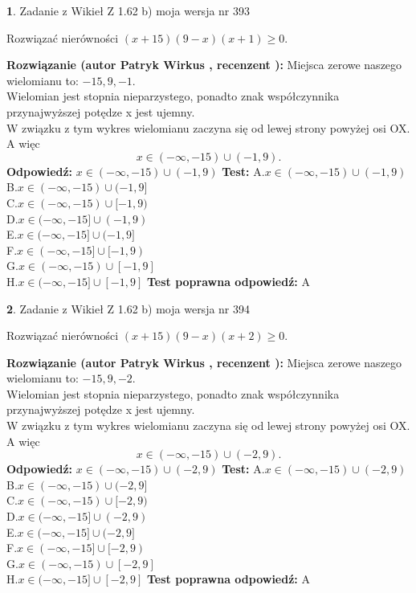 \documentclass[12pt, a4paper]{article}
\theoremstyle{definition} %
\newtheorem{zad}{}
\newcommand{\zadStart}[1]{\begin{zad}#1\newline}
\newcommand{\zadStop}{\end{zad}}
\newcommand{\rozwStart}[2]{\noindent \textbf{Rozwiązanie (autor #1 , recenzent #2): }\newline}
\newcommand{\rozwStop}{\newline}
\newcommand{\odpStart}{\noindent \textbf{Odpowiedź:}\newline}
\newcommand{\odpStop}{\newline}
\newcommand{\testStart}{\noindent \textbf{Test:}\newline}
\newcommand{\testStop}{\newline}
\newcommand{\kluczStart}{\noindent \textbf{Test poprawna odpowiedź:}\newline}
\newcommand{\kluczStop}{\newline}
\begin{document}
\zadStart{Zadanie z Wikieł Z 1.62 b) moja wersja nr 393}

Rozwiązać nierówności $(x+15)(9-x)(x+1)\ge0$.
\zadStop
\rozwStart{Patryk Wirkus}{}
Miejsca zerowe naszego wielomianu to: $-15, 9, -1$.\\
Wielomian jest stopnia nieparzystego, ponadto znak współczynnika przy\linebreak najwyższej potędze x jest ujemny.\\ W związku z tym wykres wielomianu zaczyna się od lewej strony powyżej osi OX. A więc $$x \in (-\infty,-15) \cup (-1,9).$$
\rozwStop
\odpStart
$x \in (-\infty,-15) \cup (-1,9)$
\odpStop
\testStart
A.$x \in (-\infty,-15) \cup (-1,9)$\\
B.$x \in (-\infty,-15) \cup (-1,9]$\\
C.$x \in (-\infty,-15) \cup [-1,9)$\\
D.$x \in (-\infty,-15] \cup (-1,9)$\\
E.$x \in (-\infty,-15] \cup (-1,9]$\\
F.$x \in (-\infty,-15] \cup [-1,9)$\\
G.$x \in (-\infty,-15) \cup [-1,9]$\\
H.$x \in (-\infty,-15] \cup [-1,9]$
\testStop
\kluczStart
A
\kluczStop



\zadStart{Zadanie z Wikieł Z 1.62 b) moja wersja nr 394}

Rozwiązać nierówności $(x+15)(9-x)(x+2)\ge0$.
\zadStop
\rozwStart{Patryk Wirkus}{}
Miejsca zerowe naszego wielomianu to: $-15, 9, -2$.\\
Wielomian jest stopnia nieparzystego, ponadto znak współczynnika przy\linebreak najwyższej potędze x jest ujemny.\\ W związku z tym wykres wielomianu zaczyna się od lewej strony powyżej osi OX. A więc $$x \in (-\infty,-15) \cup (-2,9).$$
\rozwStop
\odpStart
$x \in (-\infty,-15) \cup (-2,9)$
\odpStop
\testStart
A.$x \in (-\infty,-15) \cup (-2,9)$\\
B.$x \in (-\infty,-15) \cup (-2,9]$\\
C.$x \in (-\infty,-15) \cup [-2,9)$\\
D.$x \in (-\infty,-15] \cup (-2,9)$\\
E.$x \in (-\infty,-15] \cup (-2,9]$\\
F.$x \in (-\infty,-15] \cup [-2,9)$\\
G.$x \in (-\infty,-15) \cup [-2,9]$\\
H.$x \in (-\infty,-15] \cup [-2,9]$
\testStop
\kluczStart
A
\kluczStop
\end{document}
